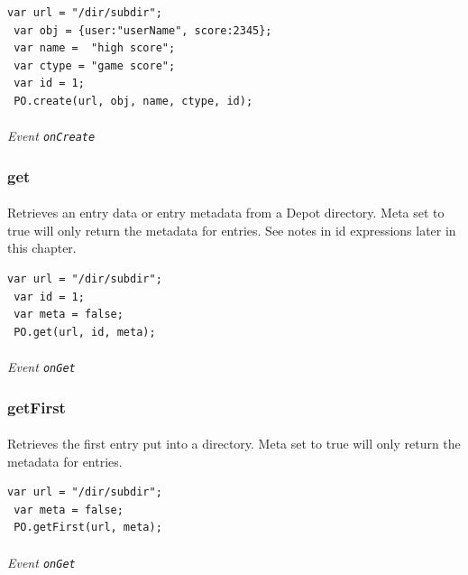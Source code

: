 \documentclass{report}
\begin{document}
\begin{Verbatim}[frame=single]
 var url = "/dir/subdir";
 var obj = {user:"userName", score:2345}; 
 var name =  "high score"; 
 var ctype = "game score"; 
 var id = 1; 
 PO.create(url, obj, name, ctype, id);
\end{Verbatim}

\paragraph{}
\textit{Event \texttt{onCreate}}

\subsubsection{get}
\paragraph{}
Retrieves an entry data or entry metadata from a Depot directory. 
Meta set to true will only return the metadata for entries. See notes in id expressions later in this chapter.

\begin{Verbatim}[frame=single]
 var url = "/dir/subdir";
 var id = 1; 
 var meta = false; 
 PO.get(url, id, meta);
\end{Verbatim}

\paragraph{}
\textit{Event \texttt{onGet}}

\subsubsection{getFirst}
\paragraph{}
Retrieves the first entry put into a directory. 
Meta set to true will only return the metadata for entries.

\begin{Verbatim}[frame=single]
 var url = "/dir/subdir";
 var meta = false;
 PO.getFirst(url, meta);
\end{Verbatim}

\paragraph{}
\textit{Event \texttt{onGet}}
\end{document}
